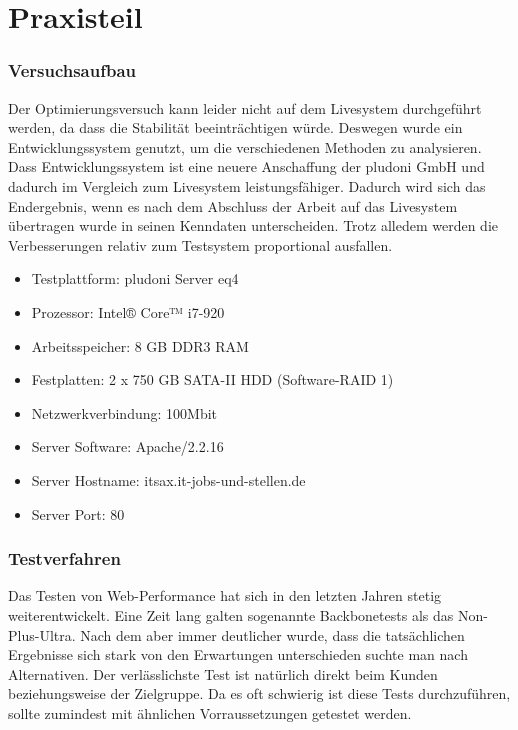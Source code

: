 \part{Praxisteil}

\section{Versuchsaufbau}
Der Optimierungsversuch kann leider nicht auf dem Livesystem durchgeführt werden, da dass die Stabilität beeinträchtigen würde. Deswegen wurde ein Entwicklungssystem genutzt, um die verschiedenen Methoden zu analysieren. Dass Entwicklungssystem ist eine neuere Anschaffung der pludoni GmbH und dadurch im Vergleich zum Livesystem leistungsfähiger. Dadurch wird sich das Endergebnis, wenn es nach dem Abschluss der Arbeit auf das Livesystem übertragen wurde in seinen Kenndaten unterscheiden. Trotz alledem werden die Verbesserungen relativ zum Testsystem proportional ausfallen. 

\begin{itemize}
 \item Testplattform: pludoni Server eq4
  \item Prozessor: Intel® Core™ i7-920
  \item Arbeitsspeicher: 8 GB DDR3 RAM
  \item Festplatten: 2 x 750 GB SATA-II HDD (Software-RAID 1)
  \item Netzwerkverbindung: 100Mbit
  \item Server Software: Apache/2.2.16
  \item Server Hostname: itsax.it-jobs-und-stellen.de
  \item Server Port: 80
\end{itemize}

\section{Testverfahren}
Das Testen von Web-Performance hat sich in den letzten Jahren stetig weiterentwickelt. Eine Zeit lang galten sogenannte Backbonetests als das Non-Plus-Ultra. Nach dem aber immer deutlicher wurde, dass die tatsächlichen Ergebnisse sich stark von den Erwartungen unterschieden suchte man nach Alternativen. Der verlässlichste Test ist natürlich direkt beim Kunden beziehungsweise der Zielgruppe. Da es oft schwierig ist diese Tests durchzuführen, sollte zumindest mit ähnlichen Vorraussetzungen getestet werden.
